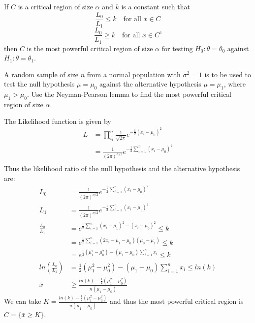 \documentclass[answers,12pt,addpoints]{exam}
\begin{document}
\begin{theorem}
    If $C$ is a critical region of size $\alpha$ and $k$ is a constant such that 
    $$ \frac{L_0}{L_1} \leq k \quad \text{for all } x \in C$$
    $$ \frac{L_0}{L_1} \geq k \quad \text{for all } x \in C^c$$
    then $C$ is the most powerful critical region of size $\alpha$ for testing $H_0: \theta = \theta_0$ against $H_1: \theta = \theta_1$.
    \begin{example}
        A random sample of size $n$ from a normal population with $\sigma^2 = 1$ is to be used to
        test the null hypothesis $\mu = \mu_0$ against the alternative hypothesis $\mu = \mu_1$, where
        $\mu_1 > \mu_0$. Use the Neyman-Pearson lemma to find the most powerful critical region
        of size $\alpha$.\\
        \begin{solution}
            The Likelihood function is given by
            \begin{align*}
                L &= \prod_{i_1}^{n} \frac{1}{\sqrt{2\pi}} e^{-\frac{1}{2}(x_i - \mu_0)^2} \\
                &= \frac{1}{(2\pi)^{n/2}} e^{-\frac{1}{2} \sum_{i=1}^{n} (x_i - \mu_0)^2} \\
            \end{align*}
            Thus the likelihood ratio of the null hypothesis and the alternative hypothesis are:
            \begin{align*}
                L_0 &= \frac{1}{(2\pi)^{n/2}} e^{-\frac{1}{2} \sum_{i=1}^{n} (x_i - \mu_0)^2} \\
                L_1 &= \frac{1}{(2\pi)^{n/2}} e^{-\frac{1}{2} \sum_{i=1}^{n} (x_i - \mu_1)^2} \\
                \frac{L_0}{L_1} &= e^{\frac{1}{2} \sum_{i=1}^{n} (x_i - \mu_1)^2 - (x_i - \mu_0)^2} \leq k \\
                &= e^{\frac{1}{2} \sum_{i=1}^{n} (2x_i - \mu_1 - \mu_0)(\mu_0 - \mu_1)} \leq k \\ 
                &= e^{\frac{1}{2} (\mu_1^2 - \mu_0^2) - (\mu_1 - \mu_0) \sum_{i=1}^{n} x_i} \leq k \\
                ln(\frac{L_0}{L_1}) &= \frac{1}{2} (\mu_1^2 - \mu_0^2) - (\mu_1 - \mu_0) \sum_{i=1}^{n} x_i \leq ln(k) \\
                \bar{x} &\geq \frac{ln(k) - \frac{1}{2} (\mu_1^2 - \mu_0^2)}{n(\mu_1 - \mu_0)}
            \end{align*}
            We can take $K = \frac{ln(k) - \frac{1}{2} (\mu_1^2 - \mu_0^2)}{n(\mu_1 - \mu_0)}$ and thus the most powerful critical region is $C = \{ \bar{x} \geq K \}$.
        \end{solution}
    \end{example}
\end{theorem}
\end{document}
